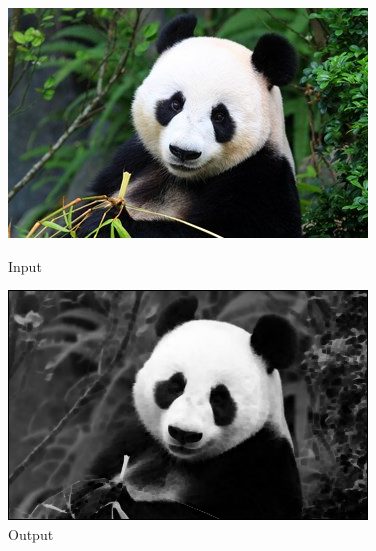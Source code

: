 \documentclass[a4paper,8pt]{article}
\begin{document}
        \begin{figure}[H]
        \centering
        \begin{minipage}{0.4\linewidth}
        \centering
        \includegraphics[width=\linewidth]{output/input1.jpg}
        \caption{Input}
        \end{minipage}
        \hfill
        \begin{minipage}{0.4\linewidth}
        \centering
        \includegraphics[width=\linewidth]{output/Min Filter_output.png}
        \caption{Output}
        \end{minipage}
        \end{figure}
        \clearpage
        
\end{document}
